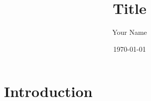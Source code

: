 \documentclass[12pt]{article}
\title{\titlefont Title}
\author{\titlefont Your Name}
\date{\faCalendar\space \bubble \today}
\begin{document}
\maketitle\thispagestyle{firststyle}



\section{Introduction}
\end{document}
